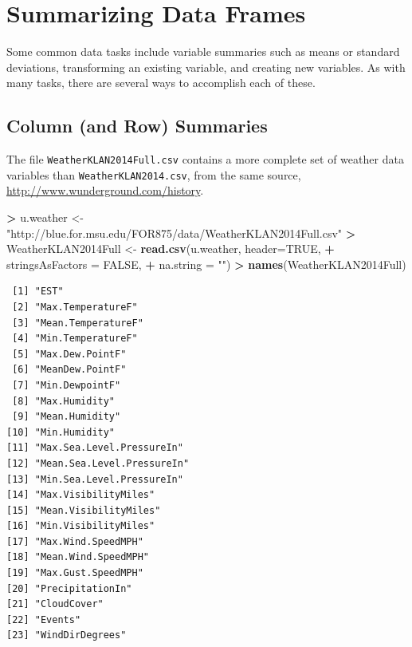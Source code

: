 \documentclass[]{krantz}
\makeatletter
\newenvironment{Shaded}{\begin{snugshade}}{\end{snugshade}}
\newcommand{\DataTypeTok}[1]{\textcolor[rgb]{0.27,0.27,0.27}{#1}}
\newcommand{\KeywordTok}[1]{\textcolor[rgb]{0.27,0.27,0.27}{\textbf{#1}}}
\newcommand{\NormalTok}[1]{#1}
\newcommand{\OperatorTok}[1]{\textcolor[rgb]{0.43,0.43,0.43}{\textbf{#1}}}
\newcommand{\OtherTok}[1]{\textcolor[rgb]{0.37,0.37,0.37}{#1}}
\newcommand{\StringTok}[1]{\textcolor[rgb]{0.5,0.5,0.5}{#1}}
\newenvironment{kframe}{%
\medskip{}
\setlength{\fboxsep}{.8em}
 \def\at@end@of@kframe{}%
 \ifinner\ifhmode%
  \def\at@end@of@kframe{\end{minipage}}%
  \begin{minipage}{\columnwidth}%
 \fi\fi%
 \def\FrameCommand##1{\hskip\@totalleftmargin \hskip-\fboxsep
 \colorbox{shadecolor}{##1}\hskip-\fboxsep
     \hskip-\linewidth \hskip-\@totalleftmargin \hskip\columnwidth}%
 \MakeFramed {\advance\hsize-\width
   \@totalleftmargin\z@ \linewidth\hsize
   \@setminipage}}%
 {\par\unskip\endMakeFramed%
 \at@end@of@kframe}
\renewenvironment{Shaded}{\begin{kframe}}{\end{kframe}}
\makeatother
\begin{document}
\hypertarget{summarizing-data-frames}{%
\section{Summarizing Data Frames}\label{summarizing-data-frames}}

Some common data tasks include variable summaries such as means or standard deviations, transforming an existing variable, and creating new variables. As with many tasks, there are several ways to accomplish each of these.

\hypertarget{column-and-row-summaries}{%
\subsection{Column (and Row) Summaries}\label{column-and-row-summaries}}

The file \texttt{WeatherKLAN2014Full.csv} contains a more complete set of weather data variables than \texttt{WeatherKLAN2014.csv}, from the same source, \url{http://www.wunderground.com/history}.

\begin{Shaded}
\begin{Highlighting}[]
\OperatorTok{>}\StringTok{ }\NormalTok{u.weather <-}\StringTok{ "http://blue.for.msu.edu/FOR875/data/WeatherKLAN2014Full.csv"}
\OperatorTok{>}\StringTok{ }\NormalTok{WeatherKLAN2014Full <-}\StringTok{ }\KeywordTok{read.csv}\NormalTok{(u.weather, }\DataTypeTok{header=}\OtherTok{TRUE}\NormalTok{, }
\OperatorTok{+}\StringTok{                                }\DataTypeTok{stringsAsFactors =} \OtherTok{FALSE}\NormalTok{, }
\OperatorTok{+}\StringTok{                                }\DataTypeTok{na.string =} \StringTok{""}\NormalTok{)}
\OperatorTok{>}\StringTok{ }\KeywordTok{names}\NormalTok{(WeatherKLAN2014Full)}
\end{Highlighting}
\end{Shaded}

\begin{verbatim}
 [1] "EST"                      
 [2] "Max.TemperatureF"         
 [3] "Mean.TemperatureF"        
 [4] "Min.TemperatureF"         
 [5] "Max.Dew.PointF"           
 [6] "MeanDew.PointF"           
 [7] "Min.DewpointF"            
 [8] "Max.Humidity"             
 [9] "Mean.Humidity"            
[10] "Min.Humidity"             
[11] "Max.Sea.Level.PressureIn" 
[12] "Mean.Sea.Level.PressureIn"
[13] "Min.Sea.Level.PressureIn" 
[14] "Max.VisibilityMiles"      
[15] "Mean.VisibilityMiles"     
[16] "Min.VisibilityMiles"      
[17] "Max.Wind.SpeedMPH"        
[18] "Mean.Wind.SpeedMPH"       
[19] "Max.Gust.SpeedMPH"        
[20] "PrecipitationIn"          
[21] "CloudCover"               
[22] "Events"                   
[23] "WindDirDegrees"           
\end{verbatim}
\end{document}
